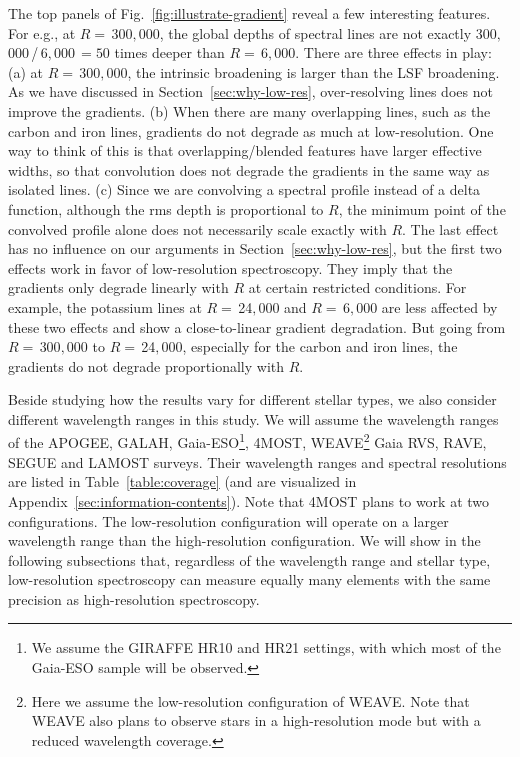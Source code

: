 \documentclass[iop]{emulateapj}
\begin{document}
\begin{CJK*}{UTF8}{gbsn}
The top panels of Fig.~\ref{fig:illustrate-gradient} reveal a few interesting features. For e.g., at $R = \,$300$,$000, the global depths of spectral lines are not exactly 300$,$000$\,$/$\,$6$,$000$\,=50$ times deeper than $R = \,$6$,$000. There are three effects in play: (a) at $R = \,$300$,$000, the intrinsic broadening is larger than the LSF broadening. As we have discussed in Section~\ref{sec:why-low-res}, over-resolving lines does not improve the gradients. (b) When there are many overlapping lines, such as the carbon and iron lines, gradients do not degrade as much at low-resolution. One way to think of this is that overlapping/blended features have larger effective widths, so that convolution does not degrade the gradients in the same way as isolated lines. (c) Since we are convolving a spectral profile instead of a delta function, although the rms depth is proportional to $R$, the minimum point of the convolved profile alone does not necessarily scale exactly with $R$. The last effect has no influence on our arguments in Section~\ref{sec:why-low-res}, but the first two effects work in favor of low-resolution spectroscopy. They imply that the gradients only degrade linearly with $R$ at certain restricted conditions. For example, the potassium lines at $R=\,$24$,$000 and $R = \, $6$,$000 are less affected by these two effects and show a close-to-linear gradient degradation. But going from $R=\,$300$,$000 to $R=\,$24$,$000, especially for the carbon and iron lines, the gradients do not degrade proportionally with $R$.

Beside studying how the results vary for different stellar types, we also consider different wavelength ranges in this study. We will assume the wavelength ranges of the APOGEE, GALAH, Gaia-ESO\footnote{We assume the GIRAFFE HR10 and HR21 settings, with which most of the Gaia-ESO sample will be observed.}, 4MOST, WEAVE\footnote{Here we assume the low-resolution configuration of WEAVE. Note that WEAVE also plans to observe stars in a high-resolution mode but with a reduced wavelength coverage.} Gaia RVS, RAVE, SEGUE and LAMOST surveys. Their wavelength ranges and spectral resolutions are listed in Table~\ref{table:coverage} (and are visualized in Appendix~\ref{sec:information-contents}). Note that 4MOST plans to work at two configurations. The low-resolution configuration will operate on a larger wavelength range than the high-resolution configuration. We will show in the following subsections that, regardless of the wavelength range and stellar type, low-resolution spectroscopy can measure equally many elements with the same precision as high-resolution spectroscopy.


\end{CJK*}
\end{document}
